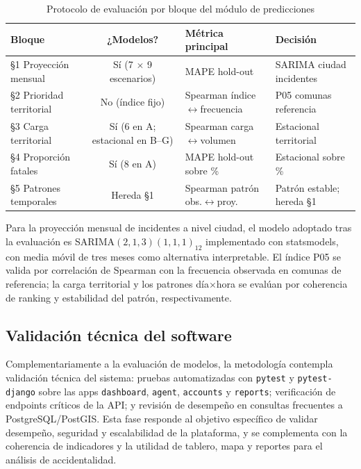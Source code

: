 \begin{table}[H]
	\centering
	\caption{Protocolo de evaluación por bloque del módulo de predicciones}
	\label{tab:protocolo-bloques}
	\small
	\begin{tabularx}{\linewidth}{@{}l c X l@{}}
		\toprule
		\textbf{Bloque} & \textbf{¿Modelos?} & \textbf{Métrica principal} & \textbf{Decisión} \\
		\midrule
		§1 Proyección mensual & Sí (7 $\times$ 9 escenarios) & MAPE hold-out & SARIMA ciudad incidentes \\
		§2 Prioridad territorial & No (índice fijo) & Spearman índice$\leftrightarrow$frecuencia & P05 comunas referencia \\
		§3 Carga territorial & Sí (6 en A; estacional en B–G) & Spearman carga$\leftrightarrow$volumen & Estacional territorial \\
		§4 Proporción fatales & Sí (8 en A) & MAPE hold-out sobre \% & Estacional sobre \% \\
		§5 Patrones temporales & Hereda §1 & Spearman patrón obs.$\leftrightarrow$proy. & Patrón estable; hereda §1 \\
		\bottomrule
	\end{tabularx}
\end{table}

Para la proyección mensual de incidentes a nivel ciudad, el modelo adoptado tras la evaluación es SARIMA$(2,1,3)(1,1,1)_{12}$ implementado con statsmodels, con media móvil de tres meses como alternativa interpretable. El índice P05 se valida por correlación de Spearman con la frecuencia observada en comunas de referencia; la carga territorial y los patrones día$\times$hora se evalúan por coherencia de ranking y estabilidad del patrón, respectivamente.

\subsection{Validación técnica del software}

Complementariamente a la evaluación de modelos, la metodología contempla validación técnica del sistema: pruebas automatizadas con \texttt{pytest} y \texttt{pytest-django} sobre las apps \texttt{dashboard}, \texttt{agent}, \texttt{accounts} y \texttt{reports}; verificación de endpoints críticos de la API; y revisión de desempeño en consultas frecuentes a PostgreSQL/PostGIS. Esta fase responde al objetivo específico de validar desempeño, seguridad y escalabilidad de la plataforma, y se complementa con la coherencia de indicadores y la utilidad de tablero, mapa y reportes para el análisis de accidentalidad.

